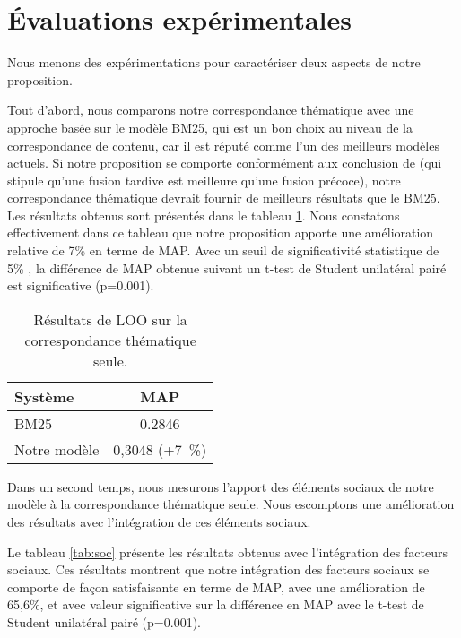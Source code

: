 \documentclass{article-hermes}
\begin{document}
\section{Évaluations expérimentales}
\label{sec:eval}

\par Nous menons des expérimentations pour caractériser deux aspects de notre proposition.
\par Tout d'abord, nous comparons notre correspondance thématique avec une approche basée sur le modèle BM25, qui est un bon choix au niveau de la correspondance de contenu, car il est réputé comme l'un des meilleurs modèles actuels. Si notre proposition se comporte conformément aux conclusion de \cite{jangseoF} (qui stipule qu'une fusion tardive est meilleure qu'une fusion précoce), notre correspondance thématique devrait fournir de meilleurs résultats que le BM25. Les résultats obtenus sont présentés dans le tableau \ref{tab:the}. Nous constatons effectivement dans ce tableau que notre proposition apporte une amélioration relative de 7\% en terme de MAP. Avec un seuil de significativité statistique de 5\% , la différence de MAP obtenue suivant un t-test de Student unilatéral pairé est significative (p=0.001).


\begin{table}[htb]
\center
\caption{\label{tab:the} Résultats de LOO sur la correspondance thématique seule.}
\begin{tabular}{|l|c|}
   \hline
   Système & MAP  \\
   \hline
   BM25  & 0.2846  \\
   \hline
   Notre modèle & 0,3048 (+7~\%)\\
   \hline
\end{tabular}
\end{table}


\par Dans un second temps, nous mesurons l'apport des éléments sociaux de notre modèle à la correspondance thématique seule. Nous escomptons une amélioration des résultats avec l'intégration de ces éléments sociaux.
\par Le tableau \ref{tab:soc} présente les résultats obtenus avec l'intégration des facteurs sociaux. Ces résultats montrent que notre intégration des facteurs sociaux se comporte de façon satisfaisante en terme de MAP, avec une amélioration de 65,6\%, et avec valeur significative sur la différence en MAP avec le t-test de Student unilatéral pairé (p=0.001). 
\end{document}
